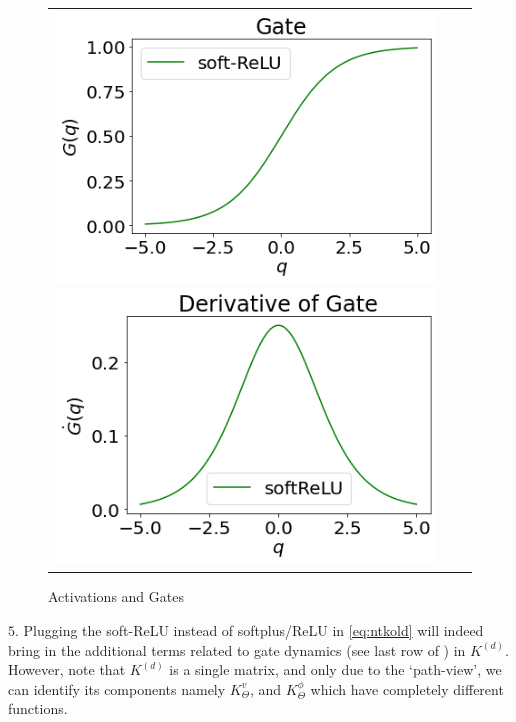 \begin{figure}[h]
{\begin{tabular}{ccc}
\includegraphics[scale=0.4]{figs/gate.png}
\includegraphics[scale=0.4]{figs/der-gate.png}
\end{tabular}
}
\caption{Activations and Gates}
\label{fig:actgate}
\end{figure}
$5.$ Plugging the soft-ReLU instead of softplus/ReLU in \eqref{eq:ntkold} will indeed bring in the additional terms related to gate dynamics (see last row of ) in $K^{(d)}$. However, note that $K^{(d)}$ is a single matrix, and only due to the `path-view', we can identify its components namely $K^v_{\Theta}$, and $K^{\phi}_{\Theta}$ which have completely different functions.
